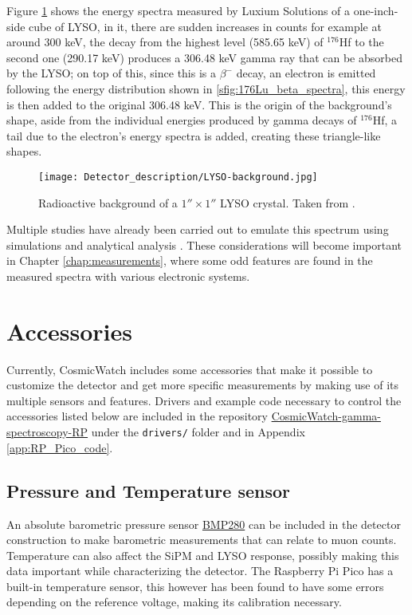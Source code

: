 Figure \ref{fig:LYSO_background} shows the energy spectra measured by Luxium Solutions of a one-inch-side cube of LYSO, in it, there are sudden increases in counts for example at around 300 keV, the decay from the highest level (585.65 keV) of $^{176}$Hf to the second one (290.17 keV) produces a 306.48 keV gamma ray that can be absorbed by the LYSO; on top of this, since this is a $\beta^{-}$ decay, an electron is emitted following the energy distribution shown in \ref{sfig:176Lu_beta_spectra}, this energy is then added to the original 306.48 keV. This is the origin of the background's shape, aside from the individual energies produced by gamma decays of $^{176}$Hf, a tail due to the electron's energy spectra is added, creating these triangle-like shapes.

\begin{figure}[H]
  \centering
  \texttt{[image: Detector\_description/LYSO-background.jpg]}
  \caption{Radioactive background of a $1''\times1''$ LYSO crystal. Taken from \cite{Luxium_LYSO}.}
  \label{fig:LYSO_background}
\end{figure}

Multiple studies have already been carried out to emulate this spectrum using simulations and analytical analysis \cite{LYSO_background,LYSO_background_Geant4}. These considerations will become important in Chapter \ref{chap:measurements}, where some odd features are found in the measured spectra with various electronic systems.

\section{Accessories}

Currently, CosmicWatch includes some accessories that make it possible to customize the detector and get more specific measurements by making use of its multiple sensors and features. Drivers and example code necessary to control the accessories listed below are included in the repository \href{https://github.com/anvargasl/CosmicWatch-gamma-spectroscopy-RP}{CosmicWatch-gamma-spectroscopy-RP} under the \texttt{drivers/} folder and in Appendix \ref{app:RP_Pico_code}.

\subsection{Pressure and Temperature sensor}

An absolute barometric pressure sensor \href{https://www.bosch-sensortec.com/products/environmental-sensors/pressure-sensors/bmp280/}{BMP280} can be included in the detector construction to make barometric measurements that can relate to muon counts. Temperature can also affect the SiPM and LYSO response, possibly making this data important while characterizing the detector. The Raspberry Pi Pico has a built-in temperature sensor, this however has been found to have some errors depending on the reference voltage, making its calibration necessary.

